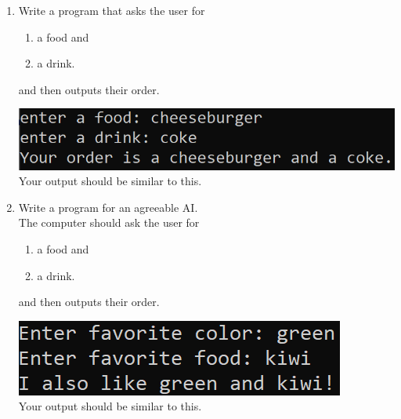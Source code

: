 \documentclass{article}
\begin{document}
\begin{enumerate}

	\item 
		Write a program that asks the user for \\
		\begin{minipage}{0.5\textwidth}
		\vspace*{-0.5em}
			\begin{enumerate}  \setlength\itemsep{-0.3em}
				\item a food and
				\item a drink.  
			\end{enumerate} \vspace*{-1ex}
		and then outputs their order.
		\end{minipage}
		\begin{minipage}{0.5\textwidth}
			\centering
			\includegraphics[scale=0.75]{./imgs/outputFoodAndDrink.png}\\
			Your output should be similar to this.
		\end{minipage}




	\item 
		Write a program for an agreeable AI.\\
		The computer should ask the user for \\
		\begin{minipage}{0.5\textwidth}
		\vspace*{-0.5em}
			\begin{enumerate}  \setlength\itemsep{-0.3em}
				\item a food and
				\item a drink.  
			\end{enumerate} \vspace*{-1ex}
		and then outputs their order.
		\end{minipage}
		\begin{minipage}{0.5\textwidth}
			\centering
			\includegraphics[scale=0.75]{./imgs/agreeableAIoutput.png}\\
			Your output should be similar to this.
		\end{minipage}



\end{enumerate}
\end{document}
